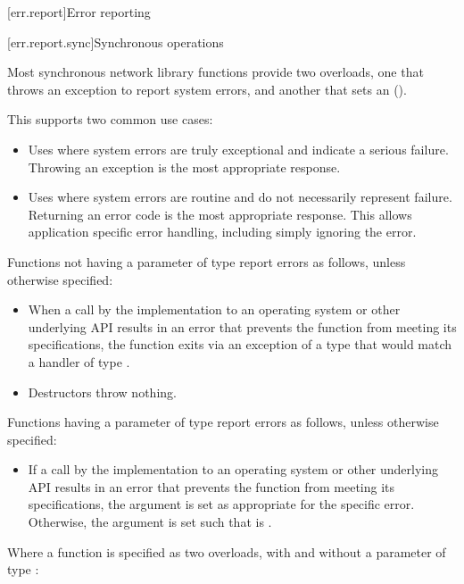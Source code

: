 
[err.report]{Error reporting}


[err.report.sync]{Synchronous operations}

\pnum
Most synchronous network library functions provide two overloads, one that throws an exception to report system errors, and another that sets an  ().

\enternote This supports two common use cases:
\begin{itemize}
\item
 Uses where system errors are truly exceptional and indicate a serious failure. Throwing an exception is the most appropriate response.
\item
 Uses where system errors are routine and do not necessarily represent failure. Returning an error code is the most appropriate response. This allows application specific error handling, including simply ignoring the error.
\exitnote
\end{itemize}
\pnum
Functions not having a parameter of type  report errors as follows, unless otherwise specified:

\begin{itemize}
\item
When a call by the implementation to an operating system or other underlying API results in an error that prevents the function from meeting its specifications, the function exits via an exception of a type that would match a handler of type .

\item
Destructors throw nothing.
\end{itemize}

\pnum
Functions having a parameter of type  report errors as follows, unless otherwise specified:

\begin{itemize}
\item
If a call by the implementation to an operating system or other underlying API results in an error that prevents the function from meeting its specifications, the  argument  is set as appropriate for the specific error. Otherwise, the  argument is set such that  is .
\end{itemize}

\pnum
Where a function is specified as two overloads, with and without a parameter of type :

